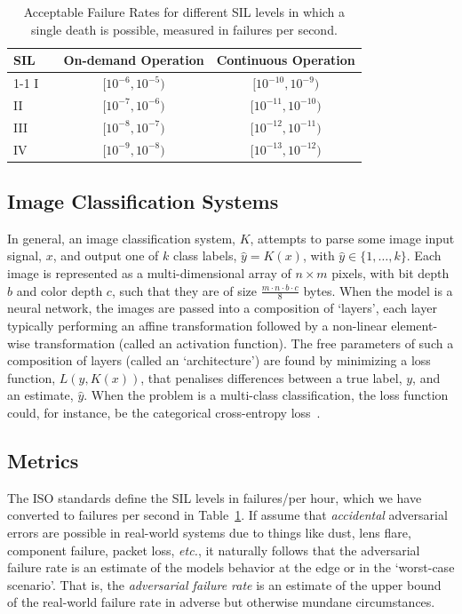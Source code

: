 \documentclass[lettersize,journal]{IEEEtran}
\begin{document}
\begin{table}[!h]
    \begin{center}
        \caption{Acceptable Failure Rates for different SIL levels in which a single death is possible, measured in failures per second.}
        \begin{tabular}{l c cc}
            \toprule
            SIL  && On-demand Operation   & Continuous Operation \\
            \cmidrule{1-1} \cmidrule{3-4}
            I     && $[10^{-6}, 10^{-5})$  & $[10^{-10}, 10^{-9})$ \\
            II    && $[10^{-7}, 10^{-6})$  & $[10^{-11}, 10^{-10})$ \\
            III   && $[10^{-8}, 10^{-7})$  & $[10^{-12}, 10^{-11})$ \\
            IV    && $[10^{-9}, 10^{-8})$  & $[10^{-13}, 10^{-12})$ \\
            \bottomrule
        \end{tabular}
        \label{tab:rate}
    \end{center}
\end{table}

\subsection{Image Classification Systems}
\label{classification}
In general, an image classification system, $K$, attempts to parse some image input signal, $x$, and output one of $k$ class labels, $\hat{y} = K(x)$, with $\hat{y} \in \{1,\ldots,k\}$. Each image is represented as a multi-dimensional array of $n\times m$ pixels, with bit depth $b$ and color depth $c$, such that they are of size $\frac{m \cdot n \cdot b \cdot c}{8}$ bytes. When the model is a neural network, the images are passed into a composition of `layers', each layer typically performing an affine transformation followed by a non-linear element-wise transformation (called an activation function). The free parameters of such a composition of layers (called an `architecture') are found by minimizing a loss function, $L(y,K(x))$, that penalises differences between a true label, $y$, and an estimate, $\hat{y}$. When the problem is a multi-class classification, the loss function could, for instance, be the categorical cross-entropy loss~\cite{biggio_evasion_2013, tsipras_robustness_2019, croce_reliable_2020, carlini_towards_2017}. 


\subsection{Metrics}
The ISO standards \cite{iso26262} define the SIL levels in failures/per hour, which we have converted to failures per second in Table~\ref{tab:rate}. If assume that \textit{accidental} adversarial errors are possible in real-world systems due to things like dust, lens flare, component failure, packet loss, \textit{etc.}, it naturally follows that the adversarial failure rate is an estimate of the models behavior at the edge or in the `worst-case scenario'. That is, the \textit{adversarial failure rate} is an estimate of the upper bound of the real-world failure rate in adverse but otherwise mundane circumstances. 
\end{document}
